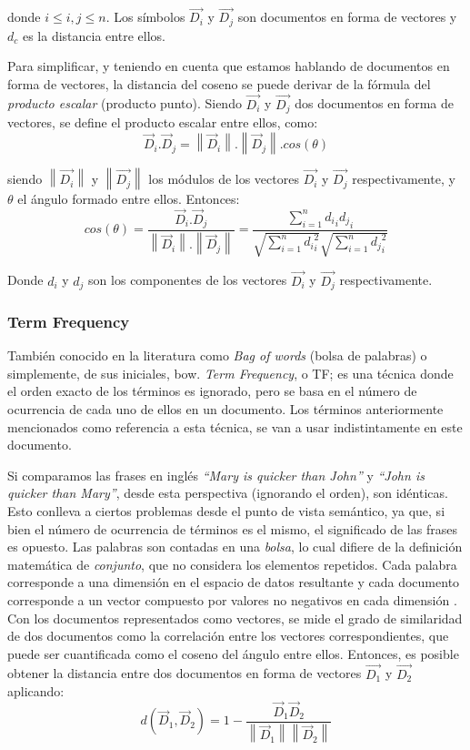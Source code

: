 donde \(i \leq i,j \leq n\). Los símbolos \(\overrightarrow{D_i}\) y \(\overrightarrow{D_j}\) son documentos en forma de vectores y \(d_c\) es la distancia entre ellos.

\bigskip Para simplificar, y teniendo en cuenta que estamos hablando de documentos en forma de vectores, la distancia del coseno se puede derivar de la fórmula del \textit{producto escalar} (producto punto). Siendo \(\overrightarrow{D_i}\) y \(\overrightarrow{D_j}\) dos documentos en forma de vectores, se define el producto escalar entre ellos, como:
\[\vec{D}_i.\vec{D}_j = \left \| \vec{D}_i \right \|.\left \| \vec{D}_j \right \|.cos(\theta)\]

siendo \(\left \|\overrightarrow{D_i}\right \|\) y \(\left \|\overrightarrow{D_j}\right \|\) los módulos de los vectores \(\overrightarrow{D_i}\) y \(\overrightarrow{D_j}\) respectivamente, y $\theta$ el ángulo formado entre ellos. Entonces:
\[cos(\theta) = \frac{\vec{D}_i.\vec{D}_j}{\left \| \vec{D}_i \right \|.\left \| \vec{D}_j \right \|}=\frac{\sum_{i=1}^{n}{{d_i}_i{d_j}_i}}{\sqrt{\sum_{i=1}^{n}{{d_i}_i^{2}}}\sqrt{\sum_{i=1}^{n}{{d_j}_i^{2}}}}\]

Donde \(d_i\) y \(d_j\) son los componentes de los vectores \(\overrightarrow{D_i}\) y \(\overrightarrow{D_j}\) respectivamente.

\subsubsection{Term Frequency}
También conocido en la literatura como \textit{Bag of words} (bolsa de palabras) o simplemente, de sus iniciales, bow. \textit{Term Frequency}, o TF; es una técnica donde el orden exacto de los términos es ignorado, pero se basa en el número de ocurrencia de cada uno de ellos \citep{christopher2008introduction} en un documento. Los términos anteriormente mencionados como referencia a esta técnica, se van a usar indistintamente en este documento.

\bigskip Si comparamos las frases en inglés \textit{“Mary is quicker than John”} y \textit{“John is quicker than Mary”}, desde esta perspectiva (ignorando el orden), son idénticas. Esto conlleva a ciertos problemas desde el punto de vista semántico, ya que, si bien el número de ocurrencia de términos es el mismo, el significado de las frases es opuesto. Las palabras son contadas en una \textit{bolsa}, lo cual difiere de la definición matemática de \textit{conjunto}, que no considera los elementos repetidos. Cada palabra corresponde a una dimensión en el espacio de datos resultante y cada documento corresponde a un vector compuesto por valores no negativos en cada dimensión \citep{huang2008similarity}. Con los documentos representados como vectores, se mide el grado de similaridad de dos documentos como la correlación entre los vectores correspondientes, que puede ser cuantificada como el coseno del ángulo entre ellos. Entonces, es posible obtener la distancia entre dos documentos en forma de vectores \(\overrightarrow{D_1}\) y \(\overrightarrow{D_2}\) aplicando:
\[d(\vec{D}_1, \vec{D}_2) = 1 - \frac{\vec{D}_1 \vec{D}_2}{\left \| \vec{D}_1 \right\| \left \| \vec{D}_2 \right\|}\]

